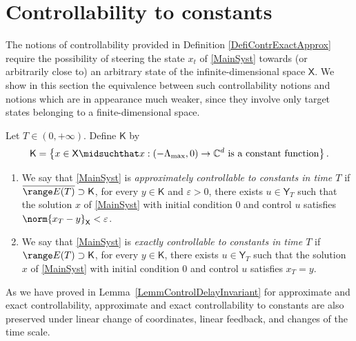 \section{Controllability to constants}
\label{SecContrConst}

The notions of controllability provided in Definition \ref{DefiContrExactApprox} require the possibility of steering the state $x_t$ of \eqref{MainSyst} towards (or arbitrarily close to) an arbitrary state of the infinite-dimensional space $\mathsf X$. We show in this section the equivalence between such controllability notions and notions which are in appearance much weaker, since they involve only target states belonging to a finite-dimensional space.

\begin{defi}
\label{DefiControlToCst}
Let $T \in (0, +\infty)$.
Define $\mathsf K$ by
\begin{equation}
\label{DefMathsfK}
\mathsf K = \left\{x \in \mathsf X \midsuchthat x: (-\Lambda_{\max}, 0) \rightarrow \mathbb C^d \text{ is a constant function}\right\}.
\end{equation}

\begin{enumerate}
\item We say that \eqref{MainSyst} is \emph{approximately controllable to constants in time $T$} if $\overline{\range E(T)} \supset \mathsf K$, \ie for every $y \in \mathsf K$ and $\varepsilon > 0$, there exists $u \in \mathsf Y_T$ such that the solution $x$ of \eqref{MainSyst} with initial condition $0$ and control $u$ satisfies $\norm{x_T - y}_{\mathsf X} < \varepsilon$.

\item We say that \eqref{MainSyst} is \emph{exactly controllable to constants in time $T$} if $\range E(T) \supset \mathsf K$, \ie for every $y \in \mathsf K$, there exists $u \in \mathsf Y_T$ such that the solution $x$ of \eqref{MainSyst} with initial condition $0$ and control $u$ satisfies $x_T = y$.
\end{enumerate}
\end{defi}

As we have proved in Lemma~\ref{LemmControlDelayInvariant} for approximate and exact controllability, approx\-imate and exact controllability to constants are also preserved under linear change of coordinates, linear feedback, and changes of the time scale.

